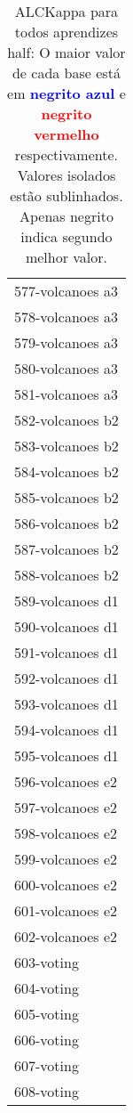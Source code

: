 \begin{table}[h]
\caption{ALCKappa para todos aprendizes half: O maior valor de cada base está em \textcolor{blue}{\textbf{negrito azul}} e \textcolor{red}{\textbf{negrito vermelho}} respectivamente. Valores isolados estão sublinhados. Apenas negrito indica segundo melhor valor.}
\begin{center}\begin{tabular}{l}
 & \\ \hline 577-volcanoes a3 &  \\
578-volcanoes a3 &  \\
579-volcanoes a3 &  \\
580-volcanoes a3 &  \\
581-volcanoes a3 &  \\
582-volcanoes b2 &  \\
583-volcanoes b2 &  \\ \hline
584-volcanoes b2 &  \\
585-volcanoes b2 &  \\
586-volcanoes b2 &  \\
587-volcanoes b2 &  \\
588-volcanoes b2 &  \\
589-volcanoes d1 &  \\
590-volcanoes d1 &  \\ \hline
591-volcanoes d1 &  \\
592-volcanoes d1 &  \\
593-volcanoes d1 &  \\
594-volcanoes d1 &  \\
595-volcanoes d1 &  \\
596-volcanoes e2 &  \\
597-volcanoes e2 &  \\ \hline
598-volcanoes e2 &  \\
599-volcanoes e2 &  \\
600-volcanoes e2 &  \\
601-volcanoes e2 &  \\
602-volcanoes e2 &  \\
603-voting &  \\
604-voting &  \\ \hline
605-voting &  \\
606-voting &  \\
607-voting &  \\
608-voting &  \\\end{tabular}\label{stratsALCKappa18AllReduxHalfb}
\end{center}
\end{table}
